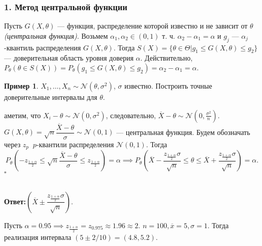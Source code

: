 \documentclass[12pt]{report}
\newenvironment{solution}{{\bfseries Решение:}}{$\square$\\\\}
\theoremstyle{definition}
\newtheorem{example}{Пример}
\begin{document}
\subsubsection{1. Метод центральной функции}
Пусть $G(X, \theta)$ — функция, распределение которой известно и не зависит от $\theta$ \emph{(центральная функция)}. Возьмем $\alpha_1, \alpha_2 \in (0, 1)$ т. ч. $\alpha_2 -\alpha_1 = \alpha$ и $g_j$ — $\alpha_j$-квантиль распределения $G(X, \theta)$. Тогда $S(X) = \{\theta \in \Theta \vert g_1 \leqslant G(X, \theta) \leqslant g_2 \}$ — доверительная область уровня доверия $\alpha$.  
Действительно, $P_\theta(\theta \in S(X)) = P_\theta(g_1 \leqslant G(X, \theta) \leqslant g_2) = \alpha_2 - \alpha_1 = \alpha.$  

\begin{example}
	$X_1, \dots, X_n \sim \mathcal{N}(\theta, \sigma^2)$, $\sigma$ известно. Построить точные доверительные интервалы для $\theta$.  
\end{example}
\begin{solution}
	аметим, что $X_i - \theta \sim \mathcal{N}(0, \sigma^2)$, следовательно, $\overline{X} - \theta \sim \mathcal{N}(0, \frac{\sigma^2}{n}).$  
$G(X, \theta) = \sqrt{n}\dfrac{\overline{X} - \theta}{\sigma} \sim \mathcal{N}(0, 1)$ — центральная функция. Будем обозначать через $z_p$ $\ p$-квантили распределения $\mathcal{N}(0, 1)$. Тогда 
$$ P_\theta\left(-z_{\frac{1+\alpha}{2}} \leqslant\sqrt{n}\dfrac{\overline{X} - \theta}{\sigma} \leqslant  z_{\frac{1+\alpha}{2}} \right) = \alpha \implies P_\theta \left(\overline{X} - \dfrac{z_{\frac{1+\alpha}{2}}  \sigma}{\sqrt{n}} \leqslant \theta \leqslant \overline{X} + \dfrac{z_{\frac{1+\alpha}{2}}  \sigma}{\sqrt{n}} \right) = \alpha.
$$
\end{solution}

\textbf{Ответ:}$\left(\overline{X} \pm \dfrac{z_{\frac{1+\alpha}{2}} \sigma}{\sqrt{n}}\right)$.

Пусть $\alpha = 0.95 \implies z_{\frac{1+\alpha}{2}} = z_{0.975} \approx 1.96 \approx 2$. $n = 100, \overline{x} = 5, \sigma=1$. Тогда реализация интервала $(5 \pm 2/10) = (4.8, 5.2).$
\end{document}

